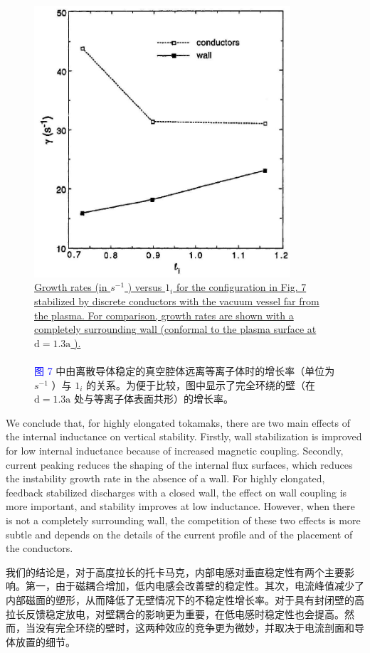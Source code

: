 \documentclass[utf8]{ctexart}
\newcommand\enzhbox[2]{
  	\quad\par \begin{paracol}{2} \colseprulecolor{black} 
  		\begin{spacing}{1.0}
  			\footnotesize  #1
  		\end{spacing}
  		\switchcolumn[1] 
  		#2
  	\end{paracol} \quad\par
  }
\begin{document}
\begin{sloppypar}
   \begin{figure}[H]
  	\centering
  	\includegraphics[max width=0.85\textwidth,max height=0.3\textheight]{2025_01_10_a0135324997886412d98g-8}
 \caption{\uline{Growth rates (in $s^{-1}$ ) versus $1_{i}$ for the configuration in Fig. 7 stabilized by discrete conductors with the vacuum vessel far from the plasma. For comparison, growth rates are shown with a completely surrounding wall (conformal to the plasma surface at $\mathrm{d}=1.3 \mathrm{a}$ ).\\}\\\textcolor{blue}{图 7} 中由离散导体稳定的真空腔体远离等离子体时的增长率（单位为 $s^{-1}$  ）与 $1_{i}$  的关系。为便于比较，图中显示了完全环绕的壁（在 $\mathrm{d}=1.3 \mathrm{a}$  处与等离子体表面共形）的增长率。}
  	\label{fig8.}
  \end{figure}
  
 
 
 
\enzhbox{  We conclude that, for highly elongated tokamaks, there are two main effects of the internal inductance on vertical stability. Firstly, wall stabilization is improved for low internal inductance because of increased magnetic coupling. Secondly, current peaking reduces the shaping of the internal flux surfaces, which reduces the instability growth rate in the absence of a wall. For highly elongated, feedback stabilized discharges with a closed wall, the effect on wall coupling is more important, and stability improves at low inductance. However, when there is not a completely surrounding wall, the competition of these two effects is more subtle and depends on the details of the current profile and of the placement of the conductors.}{
我们的结论是，对于高度拉长的托卡马克，内部电感对垂直稳定性有两个主要影响。第一，由于磁耦合增加，低内电感会改善壁的稳定性。其次，电流峰值减少了内部磁面的塑形，从而降低了无壁情况下的不稳定性增长率。对于具有封闭壁的高拉长反馈稳定放电，对壁耦合的影响更为重要，在低电感时稳定性也会提高。然而，当没有完全环绕的壁时，这两种效应的竞争更为微妙，并取决于电流剖面和导体放置的细节。}
  

\end{sloppypar}
\end{document}

